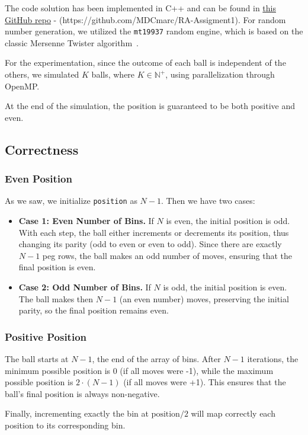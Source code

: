 \documentclass[a4paper, 11pt]{article}
\begin{document}
The code solution has been implemented in C++ and can be found in \href{https://github.com/MDCmarc/RA-Assigment1}{this GitHub repo} - (https://github.com/MDCmarc/RA-Assigment1). 
For random number generation, we utilized the \texttt{mt19937} random engine, which is based on the classic Mersenne Twister algorithm~\cite{MersenneTwister}. 

For the experimentation, since the outcome of each ball is independent of the others, we simulated $K$ balls, where $K \in \mathbb{N}^+$, using parallelization through OpenMP.

At the end of the simulation, the position is guaranteed to be both positive and even.

\subsection{Correctness}
\subsubsection*{Even Position}
As we saw, we initialize \texttt{position} as $N-1$. Then we have two cases:
\begin{itemize}
    \item \textbf{Case 1: Even Number of Bins.} If $N$ is even, the initial position is odd. With each step, the ball either increments or decrements its position, thus changing its parity (odd to even or even to odd). Since there are exactly $N-1$ peg rows, the ball makes an odd number of moves, ensuring that the final position is even.

    \item \textbf{Case 2: Odd Number of Bins.} If $N$ is odd, the initial position is even. The ball makes then $N-1$ (an even number) moves, preserving the initial parity, so the final position remains even.
\end{itemize}

\subsubsection*{Positive Position}
The ball starts at $N-1$, the end of the array of bins. After $N-1$ iterations, the minimum possible position is 0 (if all moves were -1), while the maximum possible position is $2 \cdot (N-1)$ (if all moves were +1). This ensures that the ball's final position is always non-negative.

Finally, incrementing exactly the bin at $\text{position}/2$ will map correctly each position to its corresponding bin. 
\end{document}
